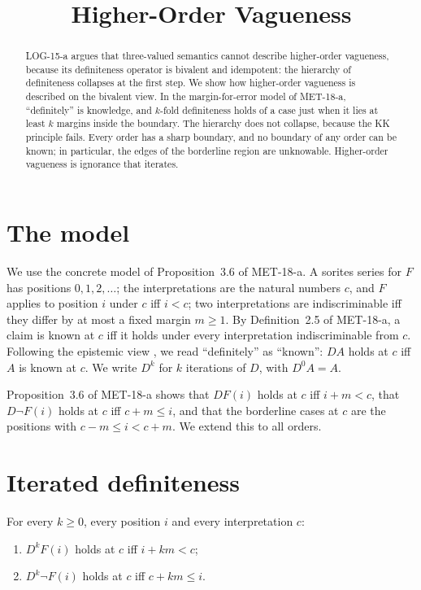 \documentclass{situationist-preprint}
\title{Higher-Order Vagueness}
\begin{document}
\maketitle

\begin{abstract}
LOG-15-a argues that three-valued semantics cannot describe higher-order vagueness, because its definiteness operator is bivalent and idempotent: the hierarchy of definiteness collapses at the first step. We show how higher-order vagueness is described on the bivalent view. In the margin-for-error model of MET-18-a, \enquote{definitely} is knowledge, and $k$-fold definiteness holds of a case just when it lies at least $k$ margins inside the boundary. The hierarchy does not collapse, because the KK principle fails. Every order has a sharp boundary, and no boundary of any order can be known; in particular, the edges of the borderline region are unknowable. Higher-order vagueness is ignorance that iterates.
\end{abstract}

\section{The model}

We use the concrete model of Proposition~3.6 of MET-18-a. A sorites series for $F$ has positions $0, 1, 2, \ldots$; the interpretations are the natural numbers $c$, and $F$ applies to position $i$ under $c$ iff $i < c$; two interpretations are indiscriminable iff they differ by at most a fixed margin $m \geq 1$. By Definition~2.5 of MET-18-a, a claim is known at $c$ iff it holds under every interpretation indiscriminable from $c$. Following the epistemic view \citep{Williamson1994}, we read \enquote{definitely} as \enquote{known}: $DA$ holds at $c$ iff $A$ is known at $c$. We write $D^k$ for $k$ iterations of $D$, with $D^0 A = A$.

Proposition~3.6 of MET-18-a shows that $DF(i)$ holds at $c$ iff $i + m < c$, that $D\neg F(i)$ holds at $c$ iff $c + m \leq i$, and that the borderline cases at $c$ are the positions with $c - m \leq i < c + m$. We extend this to all orders.

\section{Iterated definiteness}

\begin{proposition}\label{p:iter}
For every $k \geq 0$, every position $i$ and every interpretation $c$:
\begin{enumerate}[label=(\roman*)]
\item $D^k F(i)$ holds at $c$ iff $i + km < c$;
\item $D^k \neg F(i)$ holds at $c$ iff $c + km \leq i$.
\end{enumerate}
\end{proposition}
\end{document}
